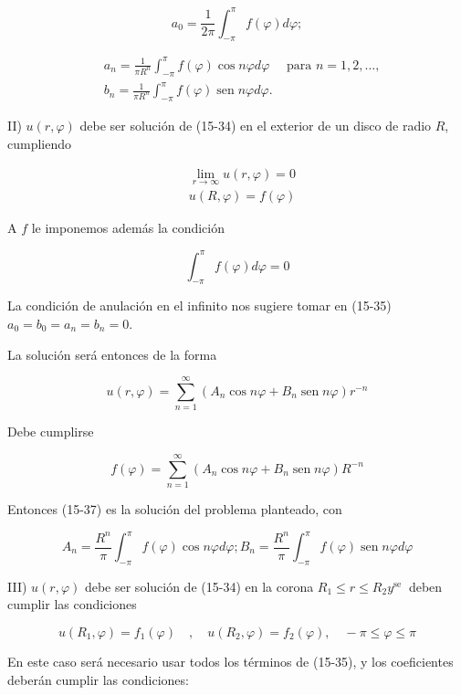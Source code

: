 \documentclass[10pt]{article}
\theoremstyle{plain}
\theoremstyle{definition}
\theoremstyle{remark}
\begin{document}
$$
a_{0}=\frac{1}{2 \pi} \int_{-\pi}^{\pi} f(\varphi) d \varphi ;
$$


$$
\begin{aligned}
& a_{n}=\frac{1}{\pi R^{n}} \int_{-\pi}^{\pi} f(\varphi) \cos n \varphi d \varphi \quad \text { para } n=1,2, \ldots, \\
& b_{n}=\frac{1}{\pi R^{n}} \int_{-\pi}^{\pi} f(\varphi) \operatorname{sen} n \varphi d \varphi .
\end{aligned}
$$

II) $u(r, \varphi)$ debe ser solución de (15-34) en el exterior de un disco de radio $R$, cumpliendo

$$
\begin{aligned}
& \lim _{r \rightarrow \infty} u(r, \varphi)=0 \\
& u(R, \varphi)=f(\varphi)
\end{aligned}
$$

A $f$ le imponemos además la condición

$$
\int_{-\pi}^{\pi} f(\varphi) d \varphi=0
$$

La condición de anulación en el infinito nos sugiere tomar en (15-35) $a_{0}=b_{0}=a_{n}=b_{n}=0$.

La solución será entonces de la forma


\begin{equation*}
u(r, \varphi)=\sum_{n=1}^{\infty}\left(A_{n} \cos n \varphi+B_{n} \operatorname{sen} n \varphi\right) r^{-n} \tag{15-37}
\end{equation*}


Debe cumplirse

$$
f(\varphi)=\sum_{n=1}^{\infty}\left(A_{n} \cos n \varphi+B_{n} \operatorname{sen} n \varphi\right) R^{-n}
$$

Entonces (15-37) es la solución del problema planteado, con

$$
A_{n}=\frac{R^{n}}{\pi} \int_{-\pi}^{\pi} f(\varphi) \cos n \varphi d \varphi ; B_{n}=\frac{R^{n}}{\pi} \int_{-\pi}^{\pi} f(\varphi) \operatorname{sen} n \varphi d \varphi
$$

III) $u(r, \varphi)$ debe ser solución de (15-34) en la corona $R_{1} \leqslant r \leqslant R_{2} y^{\text {se }}$ deben cumplir las condiciones

$$
u\left(R_{1}, \varphi\right)=f_{1}(\varphi) \quad, \quad u\left(R_{2}, \varphi\right)=f_{2}(\varphi), \quad-\pi \leqslant \varphi \leqslant \pi
$$

En este caso será necesario usar todos los términos de (15-35), y los coeficientes deberán cumplir las condiciones:
\end{document}
